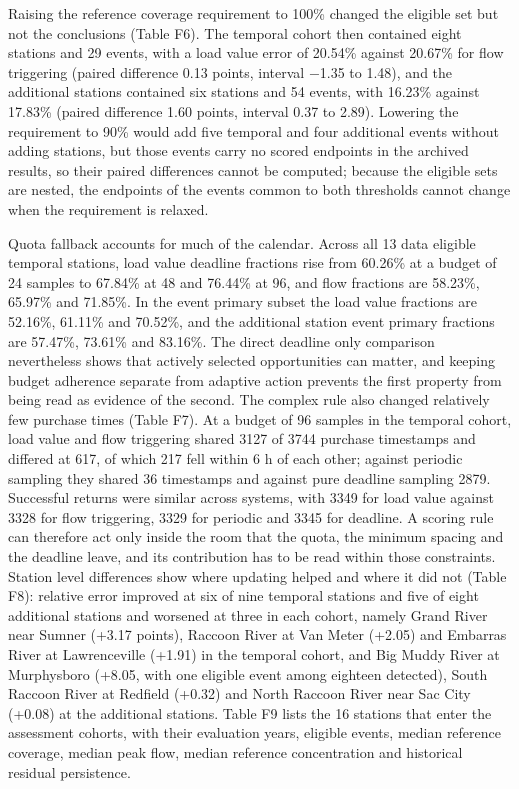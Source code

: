 \documentclass[lineno,pdflatex,sn-apa]{sn-jnl}%
\theoremstyle{thmstyleone}%
\theoremstyle{thmstyletwo}%
\theoremstyle{thmstylethree}%
\begin{document}
Raising the reference coverage requirement to 100\% changed the eligible set but not the conclusions (Table F6). The temporal cohort then contained eight stations and 29 events, with a load value error of 20.54\% against 20.67\% for flow triggering (paired difference 0.13 points, interval $-$1.35 to 1.48), and the additional stations contained six stations and 54 events, with 16.23\% against 17.83\% (paired difference 1.60 points, interval 0.37 to 2.89). Lowering the requirement to 90\% would add five temporal and four additional events without adding stations, but those events carry no scored endpoints in the archived results, so their paired differences cannot be computed; because the eligible sets are nested, the endpoints of the events common to both thresholds cannot change when the requirement is relaxed.

Quota fallback accounts for much of the calendar. Across all 13 data eligible temporal stations, load value deadline fractions rise from 60.26\% at a budget of 24 samples to 67.84\% at 48 and 76.44\% at 96, and flow fractions are 58.23\%, 65.97\% and 71.85\%. In the event primary subset the load value fractions are 52.16\%, 61.11\% and 70.52\%, and the additional station event primary fractions are 57.47\%, 73.61\% and 83.16\%. The direct deadline only comparison nevertheless shows that actively selected opportunities can matter, and keeping budget adherence separate from adaptive action prevents the first property from being read as evidence of the second. The complex rule also changed relatively few purchase times (Table F7). At a budget of 96 samples in the temporal cohort, load value and flow triggering shared 3127 of 3744 purchase timestamps and differed at 617, of which 217 fell within 6 h of each other; against periodic sampling they shared 36 timestamps and against pure deadline sampling 2879. Successful returns were similar across systems, with 3349 for load value against 3328 for flow triggering, 3329 for periodic and 3345 for deadline. A scoring rule can therefore act only inside the room that the quota, the minimum spacing and the deadline leave, and its contribution has to be read within those constraints. Station level differences show where updating helped and where it did not (Table F8): relative error improved at six of nine temporal stations and five of eight additional stations and worsened at three in each cohort, namely Grand River near Sumner (+3.17 points), Raccoon River at Van Meter (+2.05) and Embarras River at Lawrenceville (+1.91) in the temporal cohort, and Big Muddy River at Murphysboro (+8.05, with one eligible event among eighteen detected), South Raccoon River at Redfield (+0.32) and North Raccoon River near Sac City (+0.08) at the additional stations. Table F9 lists the 16 stations that enter the assessment cohorts, with their evaluation years, eligible events, median reference coverage, median peak flow, median reference concentration and historical residual persistence.
\end{document}
